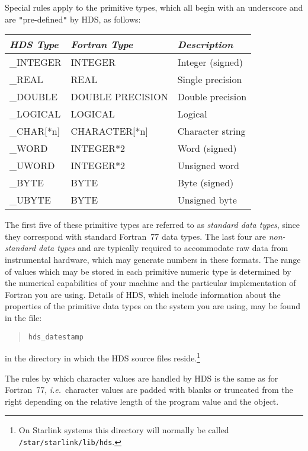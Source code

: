 \documentclass[11pt]{article}
\newcommand{\xlabel}[1]{}
\newcommand{\hi}[1]{{\tt{#1}}}
\newcommand{\qt}[1]{``#1''}
\newcommand{\st}[1]{{\em{#1}}}
\newcommand{\astar}[0]{{$*$}}
\renewcommand{\qt}[1]{{\tt{"}}#1{\tt{"}}}
\renewcommand{\astar}[0]{*}
\begin{document}
Special rules apply to the primitive types, which all begin with an
underscore and are \qt{pre-defined} by HDS, as follows:

\begin{center}
\xlabel{table_of_HDS_data_types}
\begin{tabular}{|l|l|l|}
\hline
\st{HDS Type} & \st{Fortran Type} & \st{Description}\\
\hline \hline
\_INTEGER & INTEGER & Integer (signed)\\
\_REAL & REAL & Single precision\\
\_DOUBLE & DOUBLE PRECISION & Double precision\\
\_LOGICAL & LOGICAL & Logical\\
\_CHAR[{\astar}n] & CHARACTER[{\astar}n] & Character string\\
\hline
\_WORD & INTEGER{\astar}2 & Word (signed)\\
\_UWORD & INTEGER{\astar}2 & Unsigned word\\
\_BYTE & BYTE & Byte (signed)\\
\_UBYTE & BYTE & Unsigned byte\\
\hline
\end{tabular}
\end{center}

The first five of these primitive types are referred to as
\st{standard data types}, since they correspond with standard
Fortran~77 data types. The last four are \st{non-standard data types}
and are typically required to accommodate raw data from instrumental
hardware, which may generate numbers in these formats.  The range of
values which may be stored in each primitive numeric type is
determined by the numerical capabilities of your machine and the
particular implementation of Fortran you are using. Details of HDS,
which include information about the properties of the primitive data
types on the system you are using, may be found in the file:

\small
\begin{quote}
\begin{verbatim}
hds_datestamp
\end{verbatim}
\end{quote}
\normalsize

in the directory in which the HDS source files reside.\footnote{On
Starlink systems this directory will normally be called
\hi{/star/starlink/lib/hds}.}

The rules by which character values are handled by HDS is the same as
for Fortran~77, \st{i.e.}\ character values are padded with blanks or
truncated from the right depending on the relative length of the
program value and the object.
\end{document}
